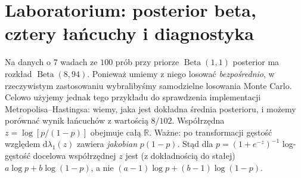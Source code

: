 \documentclass[11pt,a4paper,oneside]{report}
\numberwithin{equation}{chapter}
\theoremstyle{plain}
\theoremstyle{definition}
\theoremstyle{remark}
\newcommand{\R}{\mathbb R}
\newcommand{\dd}{\mathrm d}
\begin{document}
\section{Laboratorium: posterior beta, cztery łańcuchy i diagnostyka}
\label{sec:mcmc-laboratorium}
Na danych o $7$ wadach ze $100$ prób przy priorze
$\operatorname{Beta}(1,1)$ posterior ma rozkład
$\operatorname{Beta}(8,94)$. Ponieważ umiemy z niego
losować \emph{bezpośrednio}, w rzeczywistym zastosowaniu
wybralibyśmy samodzielne losowania Monte Carlo.
Celowo użyjemy jednak tego przykładu do sprawdzenia
implementacji Metropolisa--Hastingsa: wiemy, jaka
jest dokładna średnia posterioru, i możemy porównać
wynik łańcuchów z wartością $8/102$.
Współrzędna $z=\log[p/(1-p)]$ obejmuje całą $\R$.
Ważne: po transformacji gęstość względem $\dd\lambda_1(z)$
zawiera \emph{jakobian} $p(1-p)$.
Stąd dla $p=(1+e^{-z})^{-1}$ log-gęstość docelowa
współrzędnej $z$ jest (z dokładnością do stałej)
$a\log p+b\log(1-p)$, a nie
$(a-1)\log p+(b-1)\log(1-p)$.
\end{document}
